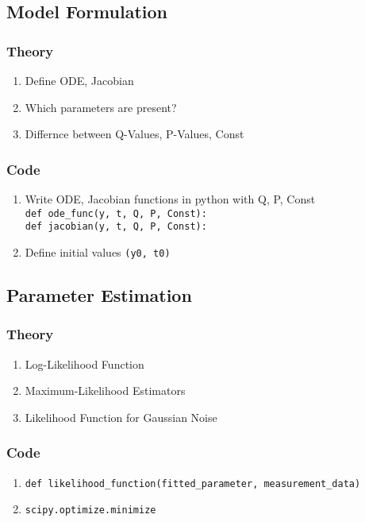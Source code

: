 \documentclass[10pt,A4paper]{article}
\begin{document}
\subsection*{Model Formulation}
\subsubsection*{Theory}
\begin{enumerate}
    \item Define ODE, Jacobian
    \item Which parameters are present?
    \item Differnce between Q-Values, P-Values, Const
\end{enumerate}
%
\subsubsection*{Code}
\begin{enumerate}
    \item Write ODE, Jacobian functions in python with Q, P, Const\\
    \texttt{def ode_func(y, t, Q, P, Const):}\\
    \texttt{def jacobian(y, t, Q, P, Const):}
    \item Define initial values \texttt{(y0, t0)}
\end{enumerate}
%
\subsection*{Parameter Estimation}
%
\subsubsection*{Theory}
\begin{enumerate}
    \item Log-Likelihood Function
    \item Maximum-Likelihood Estimators
    \item Likelihood Function for Gaussian Noise
\end{enumerate}
%
\subsubsection*{Code}
\begin{enumerate}
    \item \texttt{def likelihood_function(fitted_parameter, measurement_data)}
    \item \texttt{scipy.optimize.minimize}
\end{enumerate}
%
\end{document}
